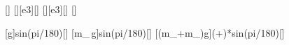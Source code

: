 [\mpss]
[\tonne][e3][\kg]
[\tonne][e3][\kg]
[\degree]

[g\sin\alpha]{\gEX*sin(\wiX*pi/180)}[\mpss]
[m_\,g\sin\alpha]{\mZuX*\gEX*sin(\wiX*pi/180)}[\newton]
[\left(m_+m_\right)g\sin\alpha]{(\mLoX+\mZuX)*\gEX*sin(\wiX*pi/180)}[\newton]
